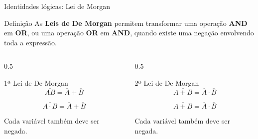 
\begin{frame}{Identidades lógicas: Lei de Morgan}
     \small

    \begin{block}{Definição}
        As \textbf{Leis de De Morgan} permitem transformar uma operação
        \textbf{AND} em \textbf{OR}, ou uma operação \textbf{OR} em
        \textbf{AND}, quando existe uma negação envolvendo toda a expressão.
    \end{block}

    \begin{columns}[T]

        \begin{column}{0.5\textwidth}
            \begin{block}{1ª Lei de De Morgan}
                \[
                    \boxed{\overline{AB}
                    =
                    \overline{A}+\overline{B}}
                \]

                \[
                    \overline{A\cdot B}
                    =
                    \overline{A}
                    +
                    \overline{B}
                \]

                Cada variável também deve ser negada.
            \end{block}
        \end{column}

        \begin{column}{0.5\textwidth}
            \begin{block}{2ª Lei de De Morgan}
                \[
                    \boxed{\overline{A+B}
                    =
                    \overline{A}\cdot\overline{B}}
                \]

                \[
                    \overline{A+B}
                    =
                    \overline{A}
                    \cdot
                    \overline{B}
                \]

                Cada variável também deve ser negada.
            \end{block}
        \end{column}

    \end{columns}
    
\end{frame}